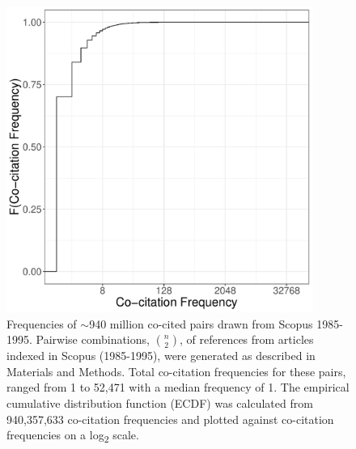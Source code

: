 \documentclass[11pt, oneside]{article}   	%
\begin{document}
\begin{figure}[h!]
\begin{center}
\includegraphics[width=10cm]{fig1}%
\end{center}
\caption{Frequencies of $\sim$940 million co-cited pairs drawn from Scopus 1985-1995. Pairwise combinations, $n\choose 2$, of references from articles indexed in Scopus (1985-1995), were generated as described in Materials and Methods. Total co-citation frequencies for these pairs, ranged from 1 to 52,471 with a median frequency of 1. The empirical cumulative distribution function (ECDF) was calculated from 940,357,633 co-citation frequencies and plotted against co-citation frequencies on a log\textsubscript{2} scale.}
\label{fig:fig1}
\end{figure}
\end{document}
